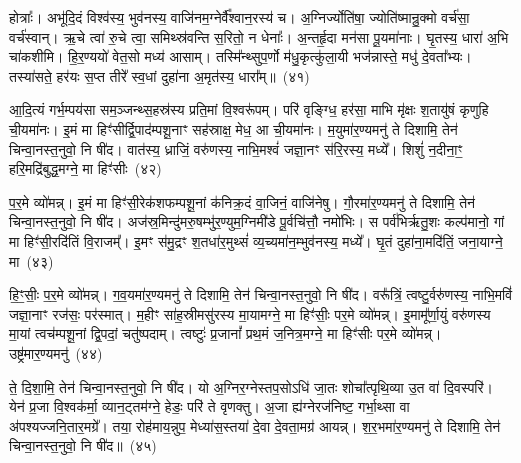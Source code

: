 होत्राः᳚। अभू॑दि॒दं विश्व॑स्य॒ भुव॑नस्य॒ वाजि॑नम॒ग्नेर्वै᳚श्वान॒रस्य॑ च। अ॒ग्निर्ज्योति॑षा॒ ज्योति॑ष्मान्रु॒क्मो वर्च॑सा॒ वर्च॑स्वान्। ऋ॒चे त्वा॑ रु॒चे त्वा॒ समिथ्स्र॑वन्ति स॒रितो॒ न धेनाः᳚। अ॒न्तर्\mbox{}हृ॒दा मन॑सा पू॒यमा॑नाः। घृ॒तस्य॒ धारा॑ अ॒भि चा॑कशीमि। हि॒र॒ण्ययो॑ वेत॒सो मध्य॑ आसाम्। तस्मि᳚न्थ्सुप॒र्णो म॑धु॒कृत्कु॑ला॒यी भज॑न्नास्ते॒ मधु॑ दे॒वता᳚भ्यः। तस्या॑सते॒ हर॑यः स॒प्त तीरे᳚ स्व॒धां दुहा॑ना अ॒मृत॑स्य॒ धारा᳚म्॥~(४१)

{\anuvakamend[{प्र॒ति॒ष्ठायै॑ स॒हस्र॑वीर्या पर॒मं वि॒राट्थ्स॒प्त तीरे॑ च॒त्वारि॑ च}]}%

आ॒दि॒त्यं गर्भ॒म्पय॑सा सम॒ञ्जन्थ्स॒हस्र॑स्य प्रति॒मां वि॒श्वरू॑पम्। परि॑ वृङ्ग्धि॒ हर॑सा॒ माभि मृ॑क्षः श॒तायु॑षं कृणुहि ची॒यमा॑नः। इ॒मं मा हिꣳ॑सीर्द्वि॒पाद॑म्पशू॒नाꣳ सह॑स्राक्ष॒ मेध॒ आ ची॒यमा॑नः। म॒युमा॑र॒ण्यमनु॑ ते दिशामि॒ तेन॑ चिन्वा॒नस्त॒नुवो॒ नि षी॑द। वात॑स्य॒ ध्राजिं॒ वरु॑णस्य॒ नाभि॒मश्वं॑ जज्ञा॒नꣳ स॑रि॒रस्य॒ मध्ये᳚। शिशुं॑ न॒दीना॒ꣳ॒ हरि॒मद्रि॑बुद्ध॒मग्ने॒ मा हिꣳ॑सीः~(४२)

प॒र॒मे व्यो॑मन्न्। इ॒मं मा हिꣳ॑सी॒रेक॑शफम्पशू॒नां क॑निक्र॒दं वा॒जिनं॒ वाजि॑नेषु। गौ॒रमा॑र॒ण्यमनु॑ ते दिशामि॒ तेन॑ चिन्वा॒नस्त॒नुवो॒ नि षी॑द। अज॑स्र॒मिन्दु॑मरु॒षम्भु॑र॒ण्युम॒ग्निमी॑डे पू॒र्वचि॑त्तौ॒ नमो॑भिः। स पर्व॑भिर्\mbox{}ऋतु॒शः कल्प॑मानो॒ गां मा हिꣳ॑सी॒रदि॑तिं वि॒राजम्᳚। इ॒मꣳ स॑मु॒द्रꣳ श॒तधा॑र॒मुथ्सं॑ व्य॒च्यमा॑न॒म्भुव॑नस्य॒ मध्ये᳚। घृ॒तं दुहा॑ना॒मदि॑तिं॒ जना॒याग्ने॒ मा~(४३)

हि॒ꣳ॒सीः॒ प॒र॒मे व्यो॑मन्न्। ग॒व॒यमा॑र॒ण्यमनु॑ ते दिशामि॒ तेन॑ चिन्वा॒नस्त॒नुवो॒ नि षी॑द। वरू᳚त्रिं॒ त्वष्टु॒र्वरु॑णस्य॒ नाभि॒मविं॑ जज्ञा॒नाꣳ रज॑सः॒ पर॑स्मात्। म॒हीꣳ सा॑ह॒स्रीमसु॑रस्य मा॒यामग्ने॒ मा हिꣳ॑सीः॒ पर॒मे व्यो॑मन्न्। इ॒मामू᳚र्णा॒युं वरु॑णस्य मा॒यां त्वच॑म्पशू॒नां द्वि॒पदां॒ चतु॑ष्पदाम्। त्वष्टुः॑ प्र॒जानां᳚ प्रथ॒मं ज॒नित्र॒मग्ने॒ मा हिꣳ॑सीः पर॒मे व्यो॑मन्न्। उष्ट्र॑मार॒ण्यमनु॑~(४४)

ते॒ दि॒शा॒मि॒ तेन॑ चिन्वा॒नस्त॒नुवो॒ नि षी॑द। यो अ॒ग्निर॒ग्नेस्तप॒सो\-ऽधि॑ जा॒तः शोचा᳚त्पृथि॒व्या उ॒त वा॑ दि॒वस्परि॑। येन॑ प्र॒जा वि॒श्वक॑र्मा॒ व्यान॒ट्तम॑ग्ने॒ हेडः॒ परि॑ ते वृणक्तु। अ॒जा ह्य॑ग्नेरज॑निष्ट॒ गर्भा॒थ्सा वा अ॑पश्यज्जनि॒तार॒मग्रे᳚। तया॒ रोह॑माय॒न्नुप॒ मेध्या॑स॒स्तया॑ दे॒वा दे॒वता॒मग्र॑ आयन्न्। श॒र॒भमा॑र॒ण्यमनु॑ ते दिशामि॒ तेन॑ चिन्वा॒नस्त॒नुवो॒ नि षी॑द॥~(४५)

{\anuvakamend[{अग्ने॒ मा हिꣳ॑सी॒रग्ने॒ मोष्ट्र॑मार॒ण्यमनु॑ शर॒भं नव॑ च}]}%

